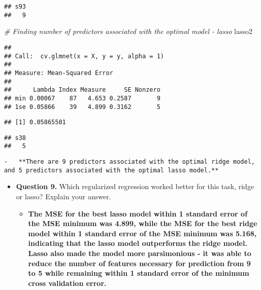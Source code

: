 \documentclass[
]{article}
\newenvironment{Shaded}{\begin{snugshade}}{\end{snugshade}}
\newcommand{\CommentTok}[1]{\textcolor[rgb]{0.56,0.35,0.01}{\textit{#1}}}
\newcommand{\DecValTok}[1]{\textcolor[rgb]{0.00,0.00,0.81}{#1}}
\newcommand{\FloatTok}[1]{\textcolor[rgb]{0.00,0.00,0.81}{#1}}
\newcommand{\NormalTok}[1]{#1}
\newcommand{\SpecialCharTok}[1]{\textcolor[rgb]{0.00,0.00,0.00}{#1}}
\providecommand{\tightlist}{%
  \setlength{\itemsep}{0pt}\setlength{\parskip}{0pt}}
\begin{document}
\begin{verbatim}
## s93 
##   9
\end{verbatim}

\begin{Shaded}
\begin{Highlighting}[]
\CommentTok{\# Finding number of predictors associated with the optimal model {-} lasso}
\NormalTok{lasso2}
\end{Highlighting}
\end{Shaded}

\begin{verbatim}
## 
## Call:  cv.glmnet(x = X, y = y, alpha = 1) 
## 
## Measure: Mean-Squared Error 
## 
##      Lambda Index Measure     SE Nonzero
## min 0.00067    87   4.653 0.2587       9
## 1se 0.05866    39   4.899 0.3162       5
\end{verbatim}

\begin{Shaded}
\end{Shaded}

\begin{verbatim}
## [1] 0.05865501
\end{verbatim}

\begin{Shaded}
\end{Shaded}

\begin{verbatim}
## s38 
##   5
\end{verbatim}

\begin{verbatim}
-   **There are 9 predictors associated with the optimal ridge model, and 5 predictors associated with the optimal lasso model.**
\end{verbatim}

\begin{itemize}
\item
  \textbf{Question 9.} Which regularized regression worked better for
  this task, ridge or lasso? Explain your answer.

  \begin{itemize}
  \tightlist
  \item
    \textbf{The MSE for the best lasso model within 1 standard error of
    the MSE minimum was 4.899, while the MSE for the best ridge model
    within 1 standard error of the MSE minimum was 5.168, indicating
    that the lasso model outperforms the ridge model. Lasso also made
    the model more parsimonious - it was able to reduce the number of
    features necessary for prediction from 9 to 5 while remaining within
    1 standard error of the minimum cross validation error.}
  \end{itemize}
\end{itemize}
\end{document}
